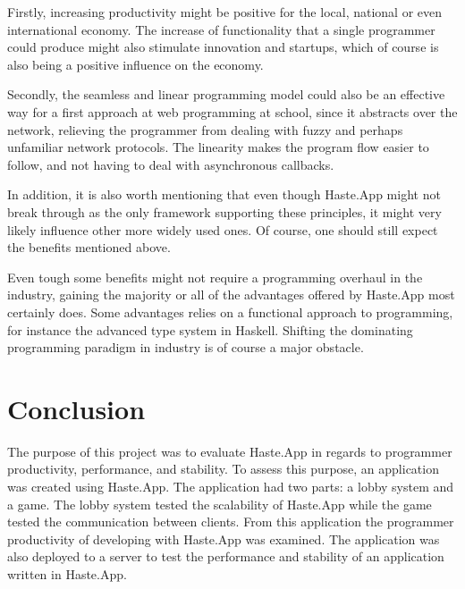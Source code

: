 \documentclass[a4paper]{article}
\begin{document}
Firstly, increasing productivity might be positive for the local, national or even international economy. The increase of functionality that a single programmer could produce might also stimulate innovation and startups, which of course is also being a positive influence on the economy. 

Secondly, the seamless and linear programming model could also be an effective way for a first approach at web programming at school, since it abstracts over the network, relieving the programmer from dealing with fuzzy and perhaps unfamiliar network protocols. The linearity makes the program flow easier to follow, and not having to deal with asynchronous callbacks. 

In addition, it is also worth mentioning that even though Haste.App might not break through as the only framework supporting these principles, it might very likely influence other more widely used ones. Of course, one should still expect the benefits mentioned above. 

Even tough some benefits might not require a programming overhaul in the industry, gaining the majority or all of the advantages offered by Haste.App most certainly does. Some advantages relies on a functional approach to programming, for instance the advanced type system in Haskell. Shifting the dominating programming paradigm in industry is of course a major obstacle.




\section{Conclusion}
The purpose of this project was to evaluate Haste.App in regards to programmer productivity, performance, and stability. To assess this purpose, an application was created using Haste.App. The application had two parts: a lobby system and a game. The lobby system tested the scalability of Haste.App while the game tested the communication between clients. From this application the programmer productivity of developing with Haste.App was examined. The application was also deployed to a server to test the performance and stability of an application written in Haste.App. 
\end{document}

